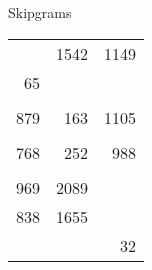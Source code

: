 \documentclass[11pt,t]{beamer}
\newcounter{acolumn}%
\begin{document}
\begin{frame}
{\begin{acolumns}[T,totalwidth=\textwidth]
\begin{column}{0.5\textwidth}
\begin{block}{Skipgrams}
\begin{tabular}{rrr}
                    \cellcolor{green!25}{13}  & 1542 & 1149 \\
                    65  & \cellcolor{green!25}{1195} & \cellcolor{green!25}{939}  \\
         && \\
                    879 & 163  & 1105 \\
                    \cellcolor{green!25}{751} & \cellcolor{green!25}{162}  & \cellcolor{green!25}{921}  \\
                    768 & 252  & 988  \\ 
         && \\
                    969 & 2089 & \cellcolor{green!25}{4}    \\   
                    838 & 1655 & \cellcolor{green!25}{4}    \\
                    \cellcolor{green!25}{581} & \cellcolor{green!25}{1155} & 32
                \end{tabular}
            \end{block}
        \end{column}
    \end{acolumns}
    }

\end{frame}
\end{document}
